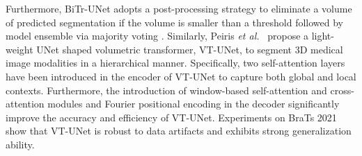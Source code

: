 \documentclass[10pt,journal,compsoc]{IEEEtran}
\begin{document}
Furthermore, BiTr-UNet adopts a post-processing strategy to eliminate a volume of predicted segmentation if the volume is smaller than a threshold \cite{isensee2018nnu} followed by model ensemble via majority voting \cite{lam1997application}.
Similarly, Peiris \textit{et al.}~\cite{peiris2021volumetric} propose a light-weight UNet shaped volumetric transformer, VT-UNet, to segment 3D medical image modalities in a hierarchical manner. Specifically, two self-attention layers have been introduced in the encoder of VT-UNet to capture both global and local contexts. Furthermore, the introduction of window-based self-attention and cross-attention modules and Fourier positional encoding in the decoder significantly improve the accuracy and efficiency of VT-UNet. Experiments on BraTs 2021~\cite{baid2021rsna} show that VT-UNet is robust to data artifacts and exhibits strong generalization ability.
\begin{table}
\centering
{}
\caption{Segmentation results and parameters of various Transformer-based models on 3D Multimodal Brain Tumor BraTS 2021 dataset~\cite{baid2021rsna}.}
\label{tab:brats21}
\end{table}
\end{document}
